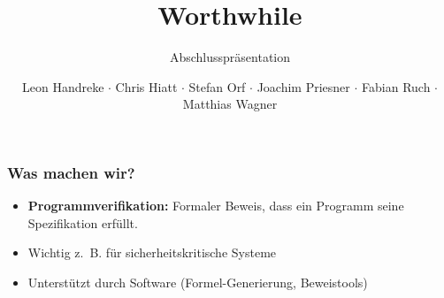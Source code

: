 \documentclass[t,svgnames]{beamer}
\title{Worthwhile}
\subtitle{Abschlusspräsentation}
\author{Leon Handreke $\cdot$ Chris Hiatt $\cdot$ Stefan Orf $\cdot$ Joachim Priesner $\cdot$ Fabian Ruch $\cdot$ Matthias Wagner}
\institute[ITI]{Institut für Theoretische Informatik}
\begin{document}
\begin{frame}
\maketitle
\end{frame}

\begin{frame}[fragile]
	\frametitle{Was machen wir?}
	
	\begin{itemize}
		\item \textbf{Programmverifikation:} Formaler Beweis, dass ein Programm seine Spezifikation erfüllt.
		\item Wichtig z.~B. für sicherheitskritische Systeme
		\item Unterstützt durch Software (Formel-Generierung, Beweistools)
	\end{itemize}
	
		
	
	
\end{frame}
\end{document}

